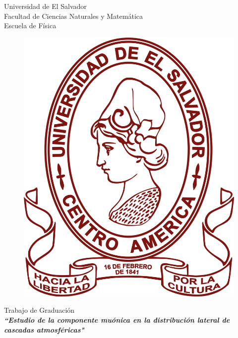 \begin{titlepage}
	\begin{center}
	\LARGE
	Universidad de El Salvador \\ 
	Facultad de Ciencias Naturales y Matemática  \\
	Escuela de Física
	\end{center}
	

	\begin{figure}[h]
	\centering
	\includegraphics[scale=0.08]{ues_logo.png}
	\end{figure}

	
	\begin{center}
	\Large
	Trabajo de Graduaci\'on	\\
	
	\LARGE
	\textit{\textbf{``Estudio de la componente mu\'onica en la distribuci\'on lateral de cascadas atmosf\'ericas"}}\\
	

\end{center}
\end{titlepage}
